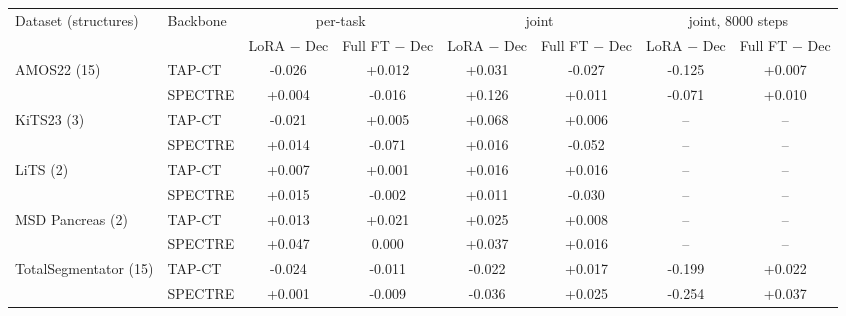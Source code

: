 \begin{tabular}{@{}llcccccc@{}}
\toprule
Dataset (structures) & Backbone & \multicolumn{2}{c}{per-task} & \multicolumn{2}{c}{joint} & \multicolumn{2}{c}{joint, 8000 steps} \\
\cmidrule(lr){3-4}\cmidrule(lr){5-6}\cmidrule(lr){7-8}
 & & LoRA $-$ Dec & Full FT $-$ Dec & LoRA $-$ Dec & Full FT $-$ Dec & LoRA $-$ Dec & Full FT $-$ Dec \\
\midrule
AMOS22 (15) & TAP-CT & -0.026 & +0.012 & +0.031 & -0.027 & -0.125 & +0.007 \\
 & SPECTRE & +0.004 & -0.016 & +0.126 & +0.011 & -0.071 & +0.010 \\
\addlinespace
KiTS23 (3) & TAP-CT & -0.021 & +0.005 & +0.068 & +0.006 & -- & -- \\
 & SPECTRE & +0.014 & -0.071 & +0.016 & -0.052 & -- & -- \\
\addlinespace
LiTS (2) & TAP-CT & +0.007 & +0.001 & +0.016 & +0.016 & -- & -- \\
 & SPECTRE & +0.015 & -0.002 & +0.011 & -0.030 & -- & -- \\
\addlinespace
MSD Pancreas (2) & TAP-CT & +0.013 & +0.021 & +0.025 & +0.008 & -- & -- \\
 & SPECTRE & +0.047 & 0.000 & +0.037 & +0.016 & -- & -- \\
\addlinespace
TotalSegmentator (15) & TAP-CT & -0.024 & -0.011 & -0.022 & +0.017 & -0.199 & +0.022 \\
 & SPECTRE & +0.001 & -0.009 & -0.036 & +0.025 & -0.254 & +0.037 \\
\bottomrule
\end{tabular}
